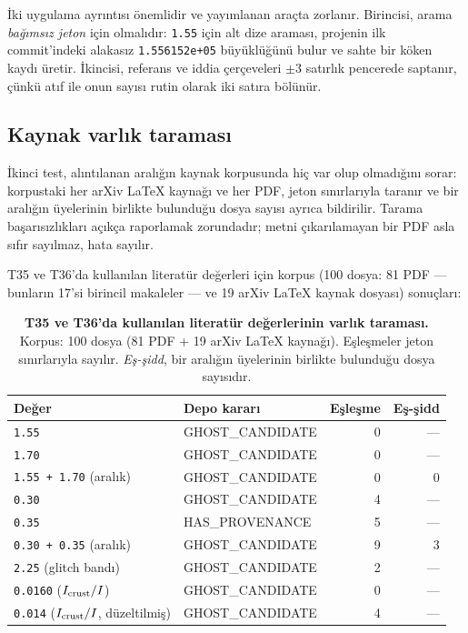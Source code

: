 \documentclass[11pt,a4paper]{article}
\begin{document}
İki uygulama ayrıntısı önemlidir ve yayımlanan araçta zorlanır. Birincisi,
arama \emph{bağımsız jeton} için olmalıdır: \texttt{1.55} için alt dize
araması, projenin ilk commit'indeki alakasız \texttt{1.556152e+05}
büyüklüğünü bulur ve sahte bir köken kaydı üretir. İkincisi, referans ve
iddia çerçeveleri $\pm3$ satırlık pencerede saptanır, çünkü atıf ile onun
sayısı rutin olarak iki satıra bölünür.

\subsection{Kaynak varlık taraması}
İkinci test, alıntılanan aralığın kaynak korpusunda hiç var olup olmadığını
sorar: korpustaki her arXiv LaTeX kaynağı ve her PDF, jeton sınırlarıyla
taranır ve bir aralığın üyelerinin birlikte bulunduğu dosya sayısı ayrıca
bildirilir. Tarama başarısızlıkları açıkça raporlamak zorundadır; metni
çıkarılamayan bir PDF asla sıfır sayılmaz, hata sayılır.

T35 ve T36'da kullanılan literatür değerleri için korpus (100 dosya: 81 PDF
— bunların 17'si birincil makaleler — ve 19 arXiv LaTeX kaynak dosyası)
sonuçları:
\begin{table}[!htbp]
\centering\footnotesize
\setlength{\tabcolsep}{5pt}
\caption{\textbf{T35 ve T36'da kullanılan literatür değerlerinin varlık
taraması.} Korpus: 100 dosya (81 PDF + 19 arXiv LaTeX kaynağı). Eşleşmeler
jeton sınırlarıyla sayılır. \emph{Eş-şidd}, bir aralığın üyelerinin birlikte
bulunduğu dosya sayısıdır.}
\label{tab:scan}
\vspace{0.1cm}
\begin{tabular}{@{}llrr@{}}
\toprule
Değer & Depo kararı & Eşleşme & Eş-şidd \\
\midrule
\texttt{1.55} & GHOST\_CANDIDATE & 0 & --- \\
\texttt{1.70} & GHOST\_CANDIDATE & 0 & --- \\
\texttt{1.55\,+\,1.70} (aralık) & GHOST\_CANDIDATE & 0 & 0 \\
\texttt{0.30} & GHOST\_CANDIDATE & 4 & --- \\
\texttt{0.35} & HAS\_PROVENANCE & 5 & --- \\
\texttt{0.30\,+\,0.35} (aralık) & GHOST\_CANDIDATE & 9 & 3 \\
\texttt{2.25} (glitch bandı) & GHOST\_CANDIDATE & 2 & --- \\
\texttt{0.0160} ($I_{\rm crust}/I$) & GHOST\_CANDIDATE & 0 & --- \\
\texttt{0.014} ($I_{\rm crust}/I$, düzeltilmiş) & GHOST\_CANDIDATE & 4 & --- \\
\bottomrule
\end{tabular}
\end{table}
\end{document}

